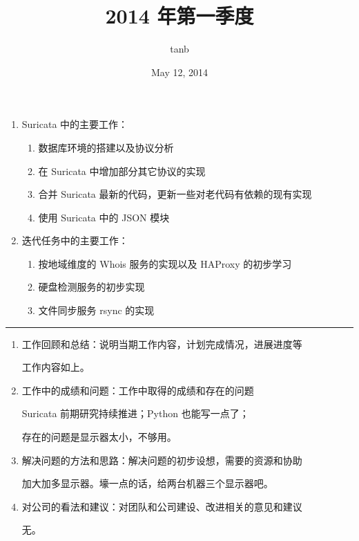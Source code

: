 \documentclass{article}
\title{2014 年第一季度}
\author{tanb}
\date{May 12, 2014}
\begin{document}
\maketitle

\begin{enumerate}
    \item Suricata 中的主要工作：
        \begin{enumerate}
            \item 数据库环境的搭建以及协议分析
            \item 在 Suricata 中增加部分其它协议的实现
            \item 合并 Suricata 最新的代码，更新一些对老代码有依赖的现有实现
            \item 使用 Suricata 中的 JSON 模块
        \end{enumerate}

    \item 迭代任务中的主要工作：
    
        \begin{enumerate}
            \item 按地域维度的 Whois 服务的实现以及 HAProxy 的初步学习
            \item 硬盘检测服务的初步实现
            \item 文件同步服务 rsync 的实现
        \end{enumerate}
\end{enumerate}

\rule{\textwidth}{1.5pt}
\begin{enumerate}
\item 工作回顾和总结：说明当期工作内容，计划完成情况，进展进度等

工作内容如上。

\item 工作中的成绩和问题：工作中取得的成绩和存在的问题

Suricata 前期研究持续推进；Python 也能写一点了；

存在的问题是显示器太小，不够用。

\item 解决问题的方法和思路：解决问题的初步设想，需要的资源和协助

加大加多显示器。壕一点的话，给两台机器三个显示器吧。

\item 对公司的看法和建议：对团队和公司建设、改进相关的意见和建议

无。
\end{enumerate}
\end{document}
